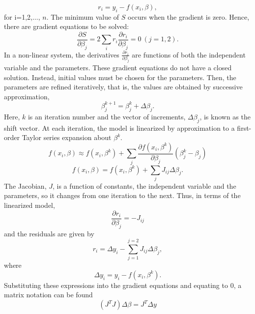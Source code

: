 \documentclass[journal]{IEEEtran}
\begin{document}
\begin{equation}
    r_i = y_i - f(x_i,\beta),
\end{equation}
for i=1,2,$\dots$, $n$.
\newline
The minimum value of $S$ occurs when the gradient is zero. Hence, there are gradient equations to be solved:
\begin{equation}
    \frac{\partial S}{\partial \beta_j}=2\sum_i r_i\frac{\partial r_i}{\partial \beta_j}=0 \ (j=1,2).
\end{equation}
In a non-linear system, the derivatives $\frac{\partial r_i}{\partial \beta_j}$ are functions of both the independent
variable and the parameters. These gradient equations do not have a
closed solution. Instead, initial values must be chosen for the
parameters. Then, the parameters are refined iteratively, that is,
the values are obtained by successive approximation,
\begin{equation}
    \beta_j^{k+1}=\beta^k_j+\Delta \beta_j.
\end{equation}
Here, $k$ is an iteration number and the vector of increments, $\Delta \beta_j$, is known as the shift vector. At each iteration,
the model is linearized by approximation to a first-order Taylor series expansion about $\beta^k$.
\begin{equation}
    f(x_i,\beta)\approx f(x_i,\beta^k) +\sum_j \frac{\partial f(x_i, \beta^k)}{\partial \beta_j} \left(\beta^k_j -\beta_j \right)
\end{equation}
\begin{equation}
 f(x_i,\beta) =f(x_i, \beta^k)+\sum_j J_{ij} \Delta\beta_j.
\end{equation}
The Jacobian, $J$, is a function of constants, the independent
variable and the parameters, so it changes from one iteration to the
next. Thus, in terms of the linearized model,
\begin{equation}
\frac{\partial r_i}{\partial \beta_j}=-J_{ij}
\end{equation}
and the residuals are given by
\begin{equation}
    r_i=\Delta y_i- \sum_{j=1}^{j=2} J_{ij}\Delta\beta_j,
\end{equation}
where
\begin{equation}
 \Delta y_i=y_i- f(x_i, \beta^k).
\end{equation}
Substituting these expressions into the gradient equations and
equating to $0$, a matrix notation can be found
\begin{equation}
    \left(J^TJ\right)\Delta  \beta=J^T\Delta y
\end{equation}
\end{document}
